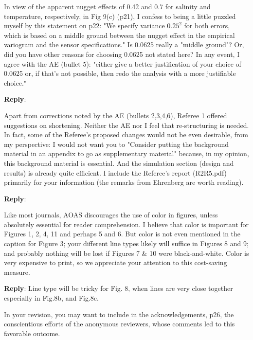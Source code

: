 \documentclass[a4paper]{article}
\newcounter{reviewer}
\def\reply{\textbf{Reply}}
\begin{document}
\vspace{5mm}
 In view of the apparent nugget effects of 0.42 and 0.7 for salinity
and temperature, respectively, in Fig 9(c) (p21), I confess to being
a little puzzled myself by this statement on p22:
"We specify variance $0.25^2$ for both errors, which is based on a
middle ground between the nugget effect in the empirical variogram
and the sensor specifications."  Is 0.0625 really a "middle ground"?
Or, did you have other reasons for choosing 0.0625 not stated here?
In any event, I agree with the AE (bullet 5): "either give a better
justification of your choice of 0.0625 or, if that’s not possible,
then redo the analysis with a more justifiable choice."

\vspace{5mm}
\reply:

\vspace{5mm}
 Apart from corrections noted by the AE (bullets 2,3,4,6), Referee 1
offered suggestions on shortening. Neither the AE nor I feel that re-structuring is needed.  In fact, some of the Referee's proposed changes would not be even desirable, from my perspective: I would not want you to "Consider putting the background material in an appendix to go as supplementary material" because, in my opinion, this background material is essential. And the simulation section (design and results) is already quite efficient. I include the Referee's report (R2R5.pdf) primarily for your information (the remarks from Ehrenberg are worth reading).

\vspace{5mm}
\reply: 

\vspace{5mm}
 Like most journals, AOAS discourages the use of color in figures,
unless absolutely essential for reader comprehension.  I believe
that color is important for Figures 1, 2, 4, 11 and perhaps 5 and 6.
But color is not even mentioned in the caption for Figure 3; your
different line types likely will suffice in Figures 8 and 9; and
probably nothing will be lost if Figures 7 & 10 were black-and-white.
Color is very expensive to print, so we appreciate your attention
to this cost-saving measure.

\vspace{5mm}
\reply: Line type will be tricky for Fig. 8, when lines are very close together especially in Fig.8b, and Fig.8c. 

\vspace{5mm}
 In your revision, you may want to include in the
acknowledgements, p26, the conscientious efforts of the anonymous
reviewers, whose comments led to this favorable outcome.
\end{document}
